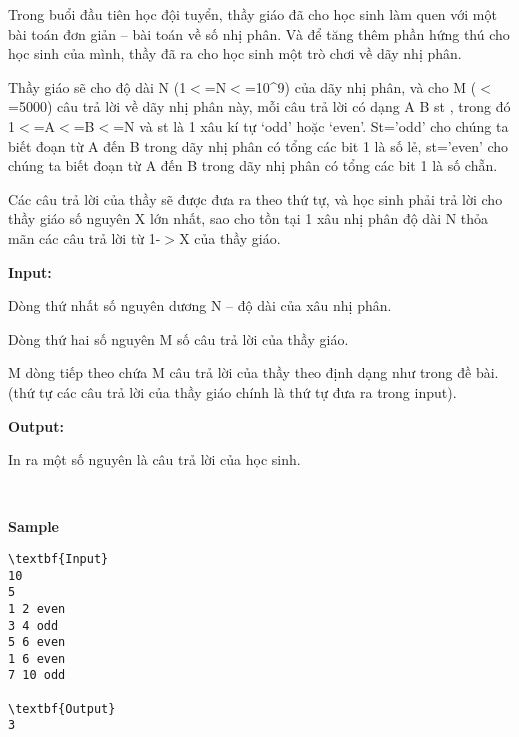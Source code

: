 

Trong buổi đầu tiên học đội tuyển, thầy giáo đã cho học sinh làm quen với một bài toán đơn giản – bài toán về số nhị phân. Và để tăng thêm phần hứng thú cho học sinh của mình, thầy đã ra cho học sinh một trò chơi về dãy nhị phân.

Thầy giáo sẽ cho độ dài N (1$<$=N$<$=10\textasciicircum9) của dãy nhị phân, và cho M ($<$=5000) câu trả lời về dãy nhị phân này, mỗi câu trả lời có dạng A B st , trong đó 1$<$=A$<$=B$<$=N và st là 1 xâu kí tự ‘odd’ hoặc ‘even’. St=’odd’ cho chúng ta biết đoạn từ A đến B trong dãy nhị phân có tổng các bit 1 là số lẻ, st=’even’ cho chúng ta biết đoạn từ A đến B trong dãy nhị phân có tổng các bit 1 là số chẵn.

Các câu trả lời của thầy sẽ được đưa ra theo thứ tự, và học sinh phải trả lời cho thầy giáo số nguyên X lớn nhất, sao cho tồn tại 1 xâu nhị phân độ dài N thỏa mãn các câu trả lời từ 1-$>$X của thầy giáo.

\textbf{Input:}

Dòng thứ nhất số nguyên dương N – độ dài của xâu nhị phân.

Dòng thứ hai số nguyên M số câu trả lời của thầy giáo.

M dòng tiếp theo chứa M câu trả lời của thầy theo định dạng như trong đề bài. (thứ tự các câu trả lời của thầy giáo chính là thứ tự đưa ra trong input).

\textbf{Output:}

In ra một số nguyên là câu trả lời của học sinh.

 

\textbf{Sample}
\begin{verbatim}
\textbf{Input}
10
5
1 2 even
3 4 odd
5 6 even
1 6 even
7 10 odd

\textbf{Output}
3\end{verbatim}